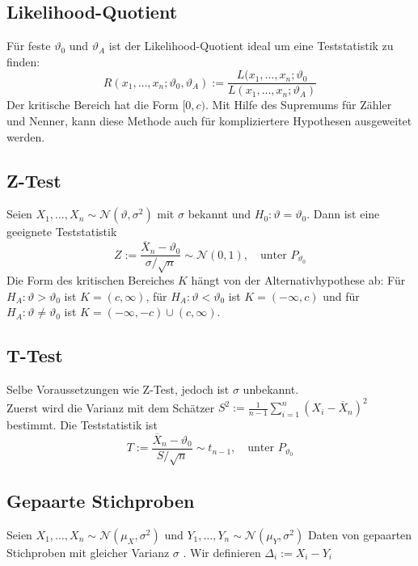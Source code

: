 \documentclass[a4paper,titlepage]{article}
\begin{document}
\subsection{Likelihood-Quotient}
Für feste $\vartheta_0$ und $\vartheta_A$ ist der Likelihood-Quotient ideal um eine Teststatistik zu finden:
\begin{equation*}
R(x_1,\dots,x_n ; \vartheta_0, \vartheta_A) := \frac{L(x_1,\dots,x_n; \vartheta_0}{L(x_1,\dots,x_n;\vartheta_A)}
\end{equation*}
Der kritische Bereich hat die Form $[0, c)$. Mit Hilfe des Supremums für Zähler und Nenner, kann diese Methode auch für kompliziertere Hypothesen ausgeweitet werden.

\subsection{Z-Test}
Seien $X_1, \dots, X_n \sim \mathcal{N}(\vartheta, \sigma^2)$ mit $\sigma$ bekannt und $H_0: \vartheta = \vartheta_0$. Dann ist eine geeignete Teststatistik
\begin{equation*}
Z := \frac{\overline{X}_n-\vartheta_0}{\sigma/\sqrt{n}} \sim \mathcal{N}(0,1), \quad \text{unter $P_{\vartheta_0}$}
\end{equation*}
Die Form des kritischen Bereiches $K$ hängt von der Alternativhypothese ab: Für $H_A: \vartheta > \vartheta_0$ ist $K = (c, \infty)$, für $H_A: \vartheta < \vartheta_0$ ist $K = (- \infty, c)$ und für $H_A: \vartheta \neq \vartheta_0$ ist $K = (- \infty, -c) \cup (c, \infty)$.

\subsection{T-Test}
Selbe Voraussetzungen wie Z-Test, jedoch ist $\sigma$ unbekannt. \\
Zuerst wird die Varianz mit dem Schätzer $S^2 := \frac{1}{n-1} \sum_{i=1}^n\left( X_i-\overline{X}_n \right)^2$ bestimmt. Die Teststatistik ist 
\begin{equation*}
T:= \frac{\overline{X}_n-\vartheta_0}{S/\sqrt{n}} \sim t_{n-1}, \quad \text{unter $P_{\vartheta_0}$}
\end{equation*}

\subsection{Gepaarte Stichproben}
Seien $X_1, \dots, X_n \sim \mathcal{N}(\mu_X, \sigma^2)$ und $Y_1, \dots, Y_n \sim \mathcal{N}(\mu_Y, \sigma^2)$ Daten von gepaarten Stichproben mit gleicher Varianz $\sigma$ . Wir definieren $\Delta_i := X_i - Y_i$
\end{document}
